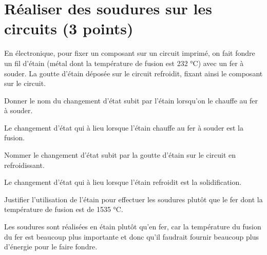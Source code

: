 \section{Réaliser des soudures sur les circuits (3 points)}

En électronique, pour fixer un composant sur un circuit imprimé, on fait fondre un fil d'étain (métal dont la température de fusion est 232 °C) avec un fer à souder. La goutte d'étain déposée sur le circuit refroidit, fixant ainsi le composant sur le circuit.

\begin{questions}
	\question[1] Donner le nom du changement d'état subit par l'étain lorsqu'on le chauffe au fer à souder.
	\begin{solution}
		Le changement d'état qui à lieu lorsque l'étain chauffe au fer à souder est la fusion.
	\end{solution}
	
	\question[1] Nommer le changement d'état subit par la goutte d'étain sur le circuit en refroidissant.
	\begin{solution}
		Le changement d'état qui à lieu lorsque l'étain refroidit est la solidification.
	\end{solution}
	
	\question[1] Justifier l'utilisation de l'étain pour effectuer les soudures plutôt que le fer dont la température de fusion est de \num{1535} °C.
	\begin{solution}
		Les soudures sont réalisées en étain plutôt qu'en fer, car la température du fusion du fer est beaucoup plus importante et donc qu'il faudrait fournir beaucoup plus d'énergie pour le faire fondre. 
	\end{solution}
\end{questions}